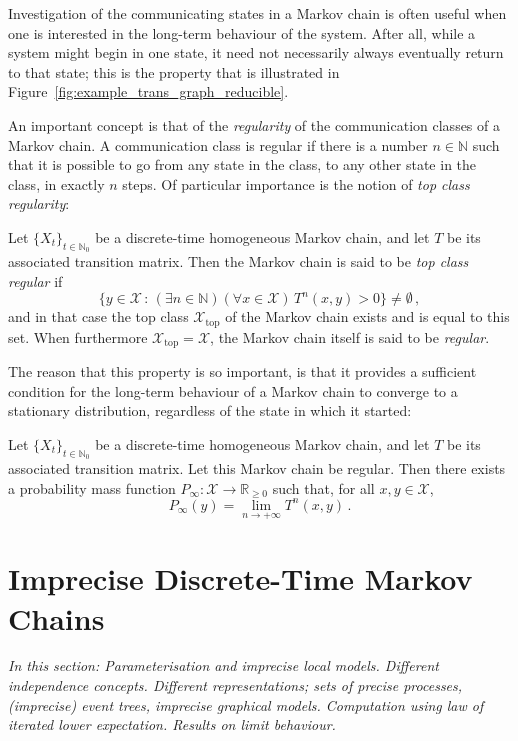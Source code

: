 \documentclass[graybox]{svmult}
\newcommand{\nats}{\mathbb{N}}
\newcommand{\natswith}{\nats_{0}}
\newcommand{\reals}{\mathbb{R}}
\newcommand{\realsnonneg}{\reals_{\geq 0}}
\newcommand{\states}{\mathcal{X}}
\begin{document}
Investigation of the communicating states in a Markov chain is often useful when one is interested in the long-term behaviour of the system. After all, while a system might begin in one state, it need not necessarily always eventually return to that state; this is the property that is illustrated in Figure~\ref{fig:example_trans_graph_reducible}.

An important concept is that of the \emph{regularity} of the communication classes of a Markov chain. A communication class is regular if there is a number $n\in\nats$ such that it is possible to go from any state in the class, to any other state in the class, in exactly $n$ steps. Of particular importance is the notion of \emph{top class regularity}:
\begin{definition}
Let $\{X_t\}_{t\in\natswith}$ be a discrete-time homogeneous Markov chain, and let $T$ be its associated transition matrix. Then the Markov chain is said to be \emph{top class regular} if
\begin{equation*}
\bigl\{ y\in\states\,:\,(\exists n\in\nats)(\forall x\in\states)\, T^n(x,y)>0 \bigr\} \neq \emptyset\,,
\end{equation*}
and in that case the top class $\states_\mathrm{top}$ of the Markov chain exists and is equal to this set. When furthermore $\states_\mathrm{top}=\states$, the Markov chain itself is said to be \emph{regular}.
\end{definition}
The reason that this property is so important, is that it provides a sufficient condition for the long-term behaviour of a Markov chain to converge to a stationary distribution, regardless of the state in which it started:
\begin{theorem}
Let $\{X_t\}_{t\in\natswith}$ be a discrete-time homogeneous Markov chain, and let $T$ be its associated transition matrix. Let this Markov chain be regular. Then there exists a probability mass function $P_\infty:\states\to\realsnonneg$ such that, for all $x,y\in\states$, 
\begin{equation*}
P_\infty(y) = \lim_{n\to+\infty}T^n(x,y)\,.
\end{equation*}
\end{theorem}

\section{Imprecise Discrete-Time Markov Chains}

\emph{In this section: Parameterisation and imprecise local models. Different independence concepts. Different representations; sets of precise processes, (imprecise) event trees, imprecise graphical models. Computation using law of iterated lower expectation. Results on limit behaviour.}
\end{document}
